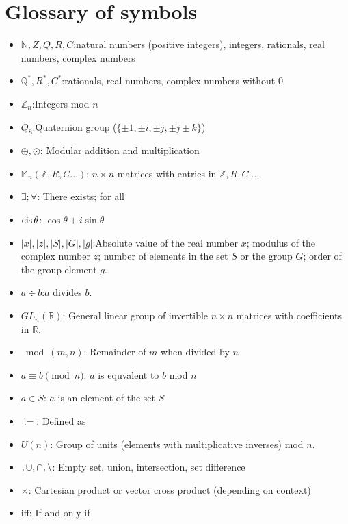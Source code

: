 \chapter{Glossary of symbols}\label{GlossaryofSymbols}

\begin{itemize}
\item[]
${\mathbb N, Z,Q,R,C}$:\quad natural numbers (positive integers), integers, rationals, real numbers, complex numbers
\item[]
${\mathbb Q^{\ast},R^{\ast},C^{\ast}}$:\quad  rationals, real numbers, complex numbers without $0$
\item[]
${\mathbb Z}_n$:\quad Integers mod $n$
\item[]
$Q_8$:\quad Quaternion group ($ \{ \pm 1, \pm i, \pm j, \pm j  \pm k \}$)
\item[]
$\oplus, \odot$: \quad Modular addition and multiplication
\item[]
${\mathbb M}_n({\mathbb Z,R,C}\ldots)$: \quad $n \times n$ matrices with entries in ${\mathbb Z,R,C}\ldots$. 
\item[]
$\exists; \forall$: \quad There exists; for all
\item[]
$\operatorname{cis} \theta$: \quad $\cos \theta + i \sin \theta$
\item[]
$|x|,|z|,|S|,|G|,|g|$:\quad Absolute value of the real number $x$; modulus of the complex number $z$; number of elements in the set $S$ or the group $G$; order of the group element $g$. 
\item[]
$a \div b$:\quad $a$ divides $b$.
\item[]
$GL_n({\mathbb R})$: \quad General linear group of invertible $n \times n$ matrices with coefficients in ${\mathbb R}$.
\item[]
 $\bmod(m,n)$: \quad Remainder of $m$ when divided by $n$
\item[]
$a \equiv b \pmod n $: \quad $a$ is equvalent to $b$ mod $n$
\item[]
$a \in S$: \quad $a$ is an element of the set $S$
\item[]
$:=$: \quad Defined as
\item[]
$U(n)$: \quad Group of units (elements with multiplicative inverses) mod $n$.
\item[]
$\empty, \cup, \cap, \setminus$: \quad Empty set, union, intersection, set difference
\item[]
$\times$: \quad Cartesian product or vector cross product (depending on context)
\item[]
iff: \quad If and only if

\end{itemize}

